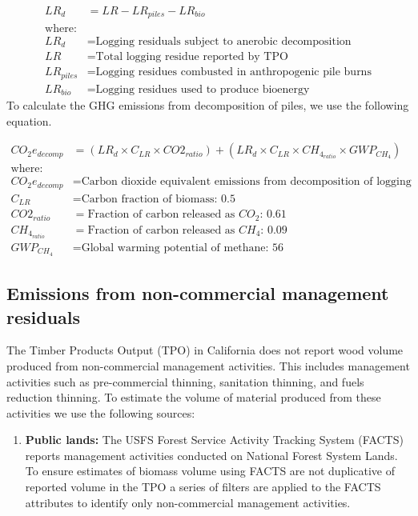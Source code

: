\documentclass[a4paper]{article}
\begin{document}
\begin{enumerate}
\begin{align*}
LR_d &= LR - LR_{piles} - LR_{bio} \\
\text{where:}\\
LR_d &= \text{Logging residuals subject to anerobic decomposition} \\
LR &= \text{Total logging residue reported by TPO}\\
LR_{piles} &= \text{Logging residues combusted in anthropogenic pile burns}\\
LR_{bio} &= \text{Logging residues used to produce bioenergy}
\end{align*}
To calculate the GHG emissions from decomposition of piles, we use the
following equation.

\begin{align*}
CO_2e_{decomp} &= \left(LR_d \times C_{LR} \times CO2_{ratio} \right) + \left(LR_d \times C_{LR} \times CH_4_{ratio}\times GWP_{CH_4}\right)\\
\text{where:}\\
CO_2e_{decomp} &= \text{Carbon dioxide equivalent emissions from decomposition of logging slash}\\
C_{LR} &= \text{Carbon fraction of biomass: 0.5}\\
CO2_{ratio} &= \text{Fraction of carbon released as } CO_2\text{: 0.61}\\
CH_4_{ratio} &= \text{Fraction of carbon released as } CH_4\text{: 0.09}\\
GWP_{CH_4} &= \text{Global warming potential of methane: 56}
\end{align*}
\end{enumerate}

\subsection{Emissions from non-commercial management residuals}
\label{sec-3-3}


The Timber Products Output (TPO) in California does not report wood volume produced from
non-commercial management activities. This includes management
activities such as pre-commercial thinning, sanitation thinning, and
fuels reduction thinning. To estimate the volume of material produced
from these activities we use the following sources:

\begin{enumerate}
\item \textbf{Public lands:} The USFS Forest Service Activity Tracking System
(FACTS) reports management activities conducted on National Forest
System Lands. To ensure estimates of biomass volume using FACTS are
not duplicative of reported volume in the TPO a series of filters are
applied to the FACTS attributes to identify only non-commercial
management activities.
\end{enumerate}
\end{document}

